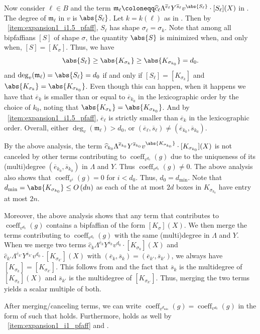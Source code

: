 \documentclass[10pt,a4paper]{amsart}
\DeclareMathOperator{\coeff}{coeff}
\newcommand*\defeq{\coloneqq}
\newcommand*\bigO[1]{%
    O\kern-0.0pt\left(#1\right)
}
\begin{document}
\begin{pf}
Now consider $\ell\in B$ and the term $\mathfrak{m}_\ell \defeq \widehat{c}_{\ell} \Lambda^{\overline{e}_\ell} Y^{\overline{s}_\ell} v^{\abs{S_\ell}} \cdot [S_\ell](X)$ in .
The degree of $\mathfrak{m}_\ell$ in $v$ is $\abs{S_\ell}$.
Let $k = k(\ell)$ as in .
Then by ~\eqref{item:expansion1_i1.5_pfaff}, $S_\ell$ has shape $\sigma_\ell = \sigma_k$.
Note that among all bipfaffians $[S]$ of shape $\sigma$, the quantity $\abs{S}$ is minimized when, and only when, $[S] = [K_\sigma]$.
Thus, we have 
\[
    \abs{S_\ell} \geq \abs{K_{\sigma_k}} \geq \abs{K_{\sigma_{k_0}}} = d_0.
\]
and $\deg_v(\mathfrak{m}_\ell)= \abs{S_\ell} = d_0$ if and only if $[S_\ell] = [K_{\sigma_k}]$ and $\abs{K_{\sigma_{k}}} = \abs{K_{\sigma_{k_0}}}$.
Even though this can happen, when it happens we have that $\overline{e}_k$ is smaller than or equal to $\overline{e}_{k_0}$ in the lexicographic order by the choice of $k_0$, noting that $\abs{K_{\sigma_{k}}} = \abs{K_{\sigma_{k_0}}}$.
And by ~\eqref{item:expansion1_i1.5_pfaff}, $\overline{e}_\ell$ is strictly smaller than $\overline{e}_k$ in the lexicographic order.
Overall, either $\deg_v(\mathfrak{m}_\ell) > d_0$, or $(\overline{e}_\ell,\overline{s}_\ell) \neq (\overline{e}_{k_0}, \overline{s}_{k_0})$.

By the above analysis, the term $\widehat{c}_{k_0} \Lambda^{\overline{e}_{k_0}} Y^{\overline{s}_{k_0}} v^{\abs{K_{\sigma_{k_0}}}} \cdot [K_{\sigma_{k_0}}](X)$ is not canceled by other terms contributing to $\coeff_{v^{d_0}}(g)$ due to the uniqueness of its (multi)degree $(\overline{e}_{k_0}, \overline{s}_{k_0})$ in $\Lambda$ and $Y$.
Thus $\coeff_{v^{d_0}}(g)\neq 0$.
The above analysis also shows that $\coeff_{v^{i}}(g)=0$ for $i < d_0$.
Thus, $d_0 = d_{\min}$.
Note that $d_{\min} = \abs{K_{\sigma_{k_0}}} \leq \bigO{dn}$ as each of the at most $2d$ boxes in $K_{\sigma_{k_0}}$ have entry at most $2n$.

Moreover, the above analysis shows that any term that contributes to $\coeff_{v^{d_0}}(g)$ contains a bipfaffian of the form $[K_\sigma](X)$.
We then merge the terms contributing to $\coeff_{v^{d_0}}(g)$ with the same (multi)degree in $\Lambda$ and $Y$.
When we merge two terms $\widehat{c}_{k} \Lambda^{\overline{e}_k} Y^{\overline{s}_k} v^{d_0} \cdot [K_{\sigma_k}](X)$ and $\widehat{c}_{k'} \Lambda^{\overline{e}_{k'}} Y^{\overline{s}_{k'}} v^{d_0} \cdot [K_{\sigma_{k'}}](X)$ with $(\overline{e}_k,\overline{s}_k) = (\overline{e}_{k'}, \overline{s}_{k'})$, we always have $[K_{\sigma_{k}}] = [K_{\sigma_{k'}}]$.
This follows from  and the fact that $\overline{s}_{k}$ is the multidegree of $[K_{\sigma_{k}}](X)$ and $\overline{s}_{k'}$ is the multidegree of $[K_{\sigma_{k'}}]$.
Thus, merging the two terms yields a scalar multiple of both.

After merging/canceling terms, we can write $\coeff_{v^{d_{\min}}}(g) = \coeff_{v^{d_0}}(g)$ in the form of  such that  holds.
Furthermore,  holds as well by ~\eqref{item:expansion1_i1_pfaff} and .
\end{pf}
\end{document}
